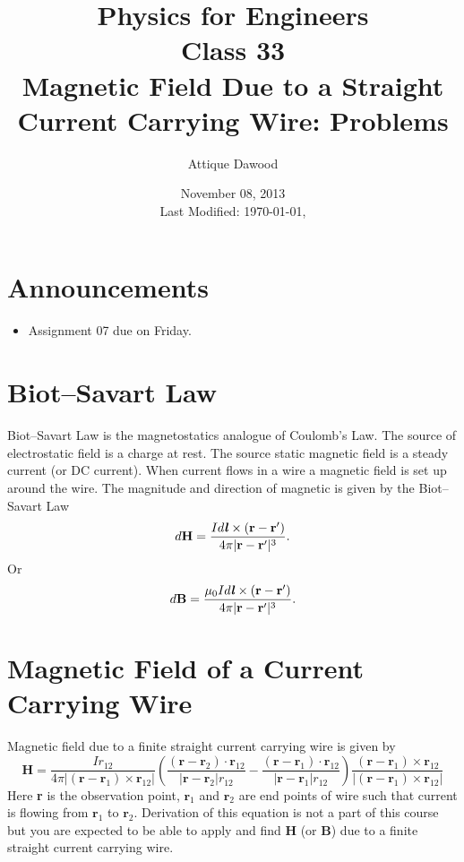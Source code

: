 \documentclass[12pt,a4paper]{article}
\title{\vspace{-3cm}Physics for Engineers\\Class 33\\Magnetic Field Due to a Straight Current Carrying Wire: Problems}
\author{Attique Dawood}
\date{November 08, 2013\\[0.2cm] Last Modified: \today, \currenttime}
\begin{document}
\maketitle
\section{Announcements}
\begin{itemize}
\item Assignment 07 due on Friday.
\end{itemize}
\section{Biot--Savart Law}
Biot--Savart Law is the magnetostatics analogue of Coulomb's Law. The source of electrostatic field is a charge at rest. The source static magnetic field is a steady current (or DC current). When current flows in a wire a magnetic field is set up around the wire. The magnitude and direction of magnetic is given by the Biot--Savart Law
\begin{equation}
d\textbf{H}=\dfrac{Id\textbf{\textit{l}}\times(\textbf{r}-\textbf{r}')}{4\pi|\textbf{r}-\textbf{r}'|^{3}}.
\end{equation}
Or
\begin{equation}
d\textbf{B}=\dfrac{\mu_0Id\textbf{\textit{l}}\times(\textbf{r}-\textbf{r}')}{4\pi|\textbf{r}-\textbf{r}'|^{3}}.
\end{equation}
\section{Magnetic Field of a Current Carrying Wire}
Magnetic field due to a finite straight current carrying wire is given by
\begin{equation}
\textbf{H}=\dfrac{Ir_{12}}{4\pi|(\textbf{r}-\textbf{r}_1)\times\textbf{r}_{12}|}\left(\dfrac{(\textbf{r}-\textbf{r}_2)\cdot\textbf{r}_{12}}{|\textbf{r}-\textbf{r}_2|r_{12}}-\dfrac{(\textbf{r}-\textbf{r}_1)\cdot\textbf{r}_{12}}{|\textbf{r}-\textbf{r}_1|r_{12}}\right)\dfrac{(\textbf{r}-\textbf{r}_1)\times\textbf{r}_{12}}{|(\textbf{r}-\textbf{r}_1)\times \textbf{r}_{12}|}
\end{equation}
Here \textbf{r} is the observation point, $\textbf{r}_1$ and $\textbf{r}_2$ are end points of wire such that current is flowing from $\textbf{r}_1$ to $\textbf{r}_2$. Derivation of this equation is not a part of this course but you are expected to be able to apply and find \textbf{H} (or \textbf{B}) due to a finite straight current carrying wire.
\newpage
\end{document}
